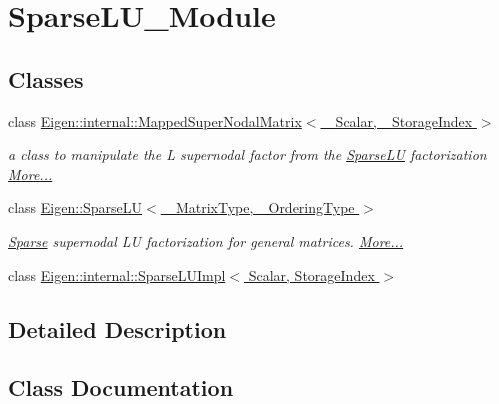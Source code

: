 \hypertarget{group___sparse_l_u___module}{}\section{Sparse\+L\+U\+\_\+\+Module}
\label{group___sparse_l_u___module}
\subsection*{Classes}
\begin{DoxyCompactItemize}
\item 
class \hyperlink{group___sparse_l_u___module_class_eigen_1_1internal_1_1_mapped_super_nodal_matrix}{Eigen\+::internal\+::\+Mapped\+Super\+Nodal\+Matrix$<$ \+\_\+\+Scalar, \+\_\+\+Storage\+Index $>$}
\begin{DoxyCompactList}\small\item\em a class to manipulate the L supernodal factor from the \hyperlink{group___sparse_l_u___module_class_eigen_1_1_sparse_l_u}{Sparse\+LU} factorization  \hyperlink{group___sparse_l_u___module_class_eigen_1_1internal_1_1_mapped_super_nodal_matrix}{More...}\end{DoxyCompactList}\item 
class \hyperlink{group___sparse_l_u___module_class_eigen_1_1_sparse_l_u}{Eigen\+::\+Sparse\+L\+U$<$ \+\_\+\+Matrix\+Type, \+\_\+\+Ordering\+Type $>$}
\begin{DoxyCompactList}\small\item\em \hyperlink{struct_eigen_1_1_sparse}{Sparse} supernodal LU factorization for general matrices.  \hyperlink{group___sparse_l_u___module_class_eigen_1_1_sparse_l_u}{More...}\end{DoxyCompactList}\item 
class \hyperlink{group___sparse_l_u___module_class_eigen_1_1internal_1_1_sparse_l_u_impl}{Eigen\+::internal\+::\+Sparse\+L\+U\+Impl$<$ Scalar, Storage\+Index $>$}
\end{DoxyCompactItemize}


\subsection{Detailed Description}


\subsection{Class Documentation}
\label{class_eigen_1_1internal_1_1_mapped_super_nodal_matrix}

